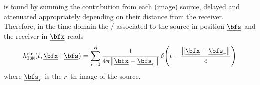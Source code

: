 



 is found by summing the contribution from each (image) source, delayed and attenuated appropriately depending on their distance from the receiver.
Therefore, in the time domain the \RIR/ associated to the source in position $\positionSource$ and the receiver in $\positionMicrophone$ reads
\begin{equation}\label{eq:acoustics:ims}
    \rir_{\mathtt{ISM}}(t, \positionMicrophone \mid \positionSource) =
    \sum_{\idxEch=0}^{\numEchs}
        \frac{1}{4 \pi \norm{\positionMicrophone - \positionSource_\idxEch}}
        \diracOf{t - \frac{\norm{\positionMicrophone - \positionSource_\idxEch}}{\speedOfSound}}
\end{equation}
where $\positionSource_\idxEch$ is the $r$-th image of the source.

